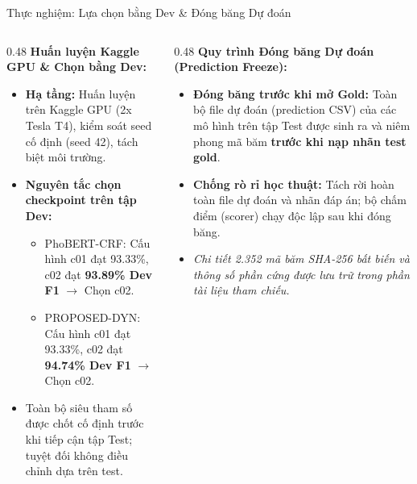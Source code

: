 \documentclass[aspectratio=169, 9pt]{beamer}
\begin{document}
\begin{frame}{Thực nghiệm: Lựa chọn bằng Dev \& Đóng băng Dự đoán}
  \vspace{-0.15cm}
  \begin{columns}[T]
    \begin{column}{0.48\textwidth}
      \textbf{Huấn luyện Kaggle GPU \& Chọn bằng Dev:}
      \begin{itemize}
        \setlength{\itemsep}{2.5pt}
        \item \textbf{Hạ tầng:} Huấn luyện trên Kaggle GPU (2x Tesla T4), kiểm soát seed cố định (seed 42), tách biệt môi trường.
        \item \textbf{Nguyên tắc chọn checkpoint trên tập Dev:}
        \begin{itemize}
          \setlength{\itemsep}{1.5pt}
          \item PhoBERT-CRF: Cấu hình c01 đạt 93.33\%, c02 đạt \textbf{93.89\% Dev F1} $\to$ Chọn c02.
          \item PROPOSED-DYN: Cấu hình c01 đạt 93.33\%, c02 đạt \textbf{94.74\% Dev F1} $\to$ Chọn c02.
        \end{itemize}
        \item Toàn bộ siêu tham số được chốt cố định trước khi tiếp cận tập Test; tuyệt đối không điều chỉnh dựa trên test.
      \end{itemize}
    \end{column}
    \begin{column}{0.48\textwidth}
      \textbf{Quy trình Đóng băng Dự đoán (Prediction Freeze):}
      \begin{itemize}
        \setlength{\itemsep}{2.5pt}
        \item \textbf{Đóng băng trước khi mở Gold:} Toàn bộ file dự đoán (prediction CSV) của các mô hình trên tập Test được sinh ra và niêm phong mã băm \textbf{trước khi nạp nhãn test gold}.
        \item \textbf{Chống rò rỉ học thuật:} Tách rời hoàn toàn file dự đoán và nhãn đáp án; bộ chấm điểm (scorer) chạy độc lập sau khi đóng băng.
        \item \textit{Chi tiết 2.352 mã băm SHA-256 bất biến và thông số phần cứng được lưu trữ trong phần tài liệu tham chiếu.}
      \end{itemize}
    \end{column}
  \end{columns}
\end{frame}
\end{document}
